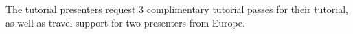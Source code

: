 The tutorial presenters request 3 complimentary tutorial passes for their tutorial,
as well as travel support for two presenters from Europe.
